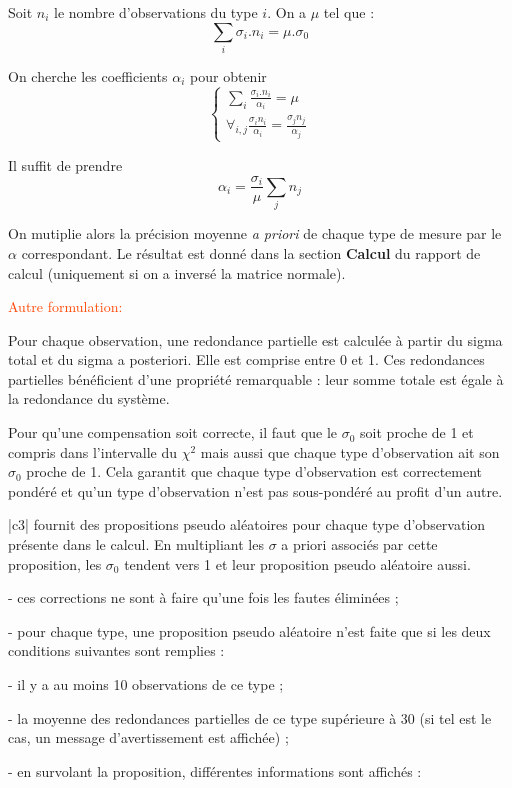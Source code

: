 \documentclass[french]{report}
\newcommand{\revoir}[1]{\textcolor{OrangeRed}{#1}}
\begin{document}
Soit $n_i$ le nombre d'observations du type $i$.
On a $\mu$ tel que :
$$ \sum_i{\sigma_i . n_i} = \mu . \sigma_0 $$

On cherche les coefficients $\alpha_i$ pour obtenir
$$\left\lbrace
\begin{array}{l}
\sum_i{\frac{\sigma_i . n_i}{\alpha_i}} = \mu \\
\forall_{i,j} \frac{\sigma_i n_i}{\alpha_i} = \frac{\sigma_j n_j}{\alpha_j}
\end{array}
\right.$$

Il suffit de prendre
$$\alpha_i=\frac{\sigma_i}{\mu} \sum_j{n_j}$$


On mutiplie alors la précision moyenne \textit{a priori} de chaque type de mesure par le $\alpha$ correspondant.
Le résultat est donné dans la section \textbf{Calcul} du rapport de calcul (uniquement si on a inversé la matrice normale).


\revoir{Autre formulation:}

Pour chaque observation, une redondance partielle est calculée à partir
du sigma total et du sigma a posteriori. Elle est comprise entre 0 et 1.
Ces redondances partielles bénéficient d'une propriété remarquable :
leur somme totale est égale à la redondance du système.

Pour qu'une compensation soit correcte, il faut que le $\sigma_0$ soit
proche de 1 et compris dans l'intervalle du $\chi^2$ mais aussi
que chaque type d'observation ait son $\sigma_0$ proche de 1. Cela
garantit que chaque type d'observation est correctement pondéré et qu'un
type d'observation n'est pas sous-pondéré au profit d'un autre.

|c3| fournit des propositions pseudo aléatoires pour chaque type
d'observation présente dans le calcul. En multipliant les $\sigma$
a priori associés par cette proposition, les $\sigma_0$ tendent
vers 1 et leur proposition pseudo aléatoire aussi.

-  ces corrections ne sont à faire qu'une fois les fautes éliminées ;

-  pour chaque type, une proposition pseudo aléatoire n'est faite que si
   les deux conditions suivantes sont remplies :

   -  il y a au moins 10 observations de ce type ;

   -  la moyenne des redondances partielles de ce type supérieure à 30%
      (si tel est le cas, un message d'avertissement est affichée) ;

-  en survolant la proposition, différentes informations sont affichés :
\end{document}
